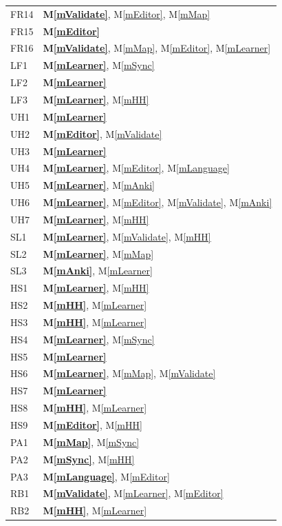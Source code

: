 \documentclass[12pt, titlepage]{article}
\newcommand{\mref}[1]{M\ref{#1}}
\begin{document}
\begin{longtable}{@{}p{}p{}@{}}
FR14 & \textbf{\mref{mValidate}}, \mref{mEditor}, \mref{mMap}\\
FR15 & \textbf{\mref{mEditor}}\\
FR16 & \textbf{\mref{mValidate}}, \mref{mMap}, \mref{mEditor}, \mref{mLearner}\\
LF1 & \textbf{\mref{mLearner}}, \mref{mSync}\\
LF2 & \textbf{\mref{mLearner}}\\
LF3 & \textbf{\mref{mLearner}}, \mref{mHH}\\
UH1 & \textbf{\mref{mLearner}}\\
UH2 & \textbf{\mref{mEditor}}, \mref{mValidate}\\
UH3 & \textbf{\mref{mLearner}}\\
UH4 & \textbf{\mref{mLearner}}, \mref{mEditor}, \mref{mLanguage}\\
UH5 & \textbf{\mref{mLearner}}, \mref{mAnki}\\
UH6 & \textbf{\mref{mLearner}}, \mref{mEditor}, \mref{mValidate}, \mref{mAnki}\\
UH7 & \textbf{\mref{mLearner}}, \mref{mHH}\\
SL1 & \textbf{\mref{mLearner}}, \mref{mValidate}, \mref{mHH}\\
SL2 & \textbf{\mref{mLearner}}, \mref{mMap}\\
SL3 & \textbf{\mref{mAnki}}, \mref{mLearner}\\
HS1 & \textbf{\mref{mLearner}}, \mref{mHH}\\
HS2 & \textbf{\mref{mHH}}, \mref{mLearner}\\
HS3 & \textbf{\mref{mHH}}, \mref{mLearner}\\
HS4 & \textbf{\mref{mLearner}}, \mref{mSync}\\
HS5 & \textbf{\mref{mLearner}}\\
HS6 & \textbf{\mref{mLearner}}, \mref{mMap}, \mref{mValidate}\\
HS7 & \textbf{\mref{mLearner}}\\
HS8 & \textbf{\mref{mHH}}, \mref{mLearner}\\
HS9 & \textbf{\mref{mEditor}}, \mref{mHH}\\
PA1 & \textbf{\mref{mMap}}, \mref{mSync}\\
PA2 & \textbf{\mref{mSync}}, \mref{mHH}\\
PA3 & \textbf{\mref{mLanguage}}, \mref{mEditor}\\
RB1 & \textbf{\mref{mValidate}}, \mref{mLearner}, \mref{mEditor}\\
RB2 & \textbf{\mref{mHH}}, \mref{mLearner}\\

\end{longtable}
\end{document}
